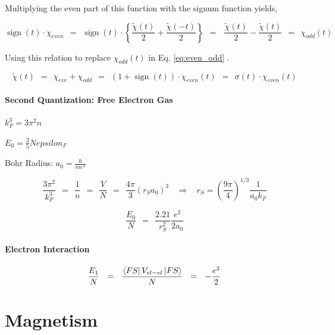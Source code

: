 \documentclass[10pt]{report}
\numberwithin{equation}{chapter}
\newcommand{\refEq}[1]{
  Eq. \ref{#1}
}
\DeclareMathOperator{\sign}{sign}
\begin{document}
Multiplying the even part of this function with the signum function yields,

\begin{equation}
  \sign(t) \cdot \chi_{even} ~~ = ~~ \sign(t) \cdot \left\{ \frac{\tilde{\chi}(t)}{2} + \frac{\tilde{\chi}(-t)}{2} \right\} ~~ = ~~~\frac{\tilde{\chi}(t)}{2} - \frac{\tilde{\chi}(t)}{2} ~~ = ~~ \chi_{odd}(t)
\end{equation}


Using this relation to replace $\chi_{odd}(t)$ in \refEq{eq:even_odd}.


\begin{equation}
\tilde{\chi}(t) ~~ = ~~ \chi_{eve} + \chi_{odd} ~~ = ~~ (1 + \sign(t)) \cdot \chi_{even}(t) ~~ = ~~ \sigma(t) \cdot \chi_{even}(t)
\end{equation}



\subsubsection*{Second Quantization: Free Electron Gas}

$ k_F^3 = 3 \pi^2 n$

$ E_0 = \frac{3}{5} N epsilon_F$

Bohr Radius: $a_0 = \frac{\hbar}{m e^2}$

\begin{equation*}
\frac{3 \pi^2}{k_F^3} ~~ = ~~ \frac{1}{n} ~~ = ~~ \frac{V}{N} ~~ = ~~ \frac{4\pi}{3} \left(r_S a_0 \right)^3 ~~~~ \Rightarrow ~~~~ r_S = \left( \frac{9\pi}{4} \right)^{1/3} \frac{1}{a_0 k_F}
\end{equation*}

\begin{equation*}
\frac{E_0}{N} ~~ = ~~ \frac{2.21}{r_S^2} \frac{e^2}{2a_0}
\end{equation*}



\subsubsection*{Electron Interaction}

\begin{equation*}
\frac{E_1}{N} ~~ = ~~ \frac{\bra{FS} V_{el-el} \ket{FS}}{N} ~~ = ~~ - \frac{e^2}{2}
\end{equation*}






\chapter{Magnetism}
\end{document}
